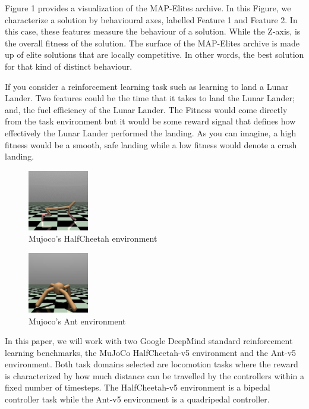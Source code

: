 \documentclass[11pt]{article}
\begin{document}
Figure 1 provides a visualization of the MAP-Elites archive. In this Figure, we characterize
 a solution by behavioural axes, labelled Feature 1 and Feature 2. In this case, these features
 measure the behaviour of a solution. While the Z-axis, is the overall fitness of the solution.
The surface of the MAP-Elites archive is made up of elite solutions that are locally competitive.
In other words, the best solution for that kind of distinct behaviour.

If you consider a reinforcement learning task such as learning to land a Lunar Lander.
Two features could be the time that it takes to land the Lunar Lander; and, the fuel
efficiency of the Lunar Lander. The Fitness would come directly from the task environment
but it would be some reward signal that defines how effectively the Lunar Lander performed the landing.
As you can imagine, a high fitness would be a smooth, safe landing while a low fitness would
denote a crash landing.

\begin{figure}[htbp]
\centering
\includegraphics[width=100px]{./half_cheetah2.png}
\caption{Mujoco's HalfCheetah environment}
\end{figure}

\begin{figure}[htbp]
\centering
\includegraphics[width=100px]{./ant2.png}
\caption{Mujoco's Ant environment}
\end{figure}

In this paper, we will work with two Google DeepMind standard reinforcement learning benchmarks,
the MuJoCo HalfCheetah-v5 environment and the Ant-v5 environment. Both task domains selected are
locomotion tasks where the reward is characterized by how much distance can be travelled by the controllers
within a fixed number of timesteps. The HalfCheetah-v5 environment is a bipedal controller task
while the Ant-v5 environment is a quadripedal controller.
\end{document}
